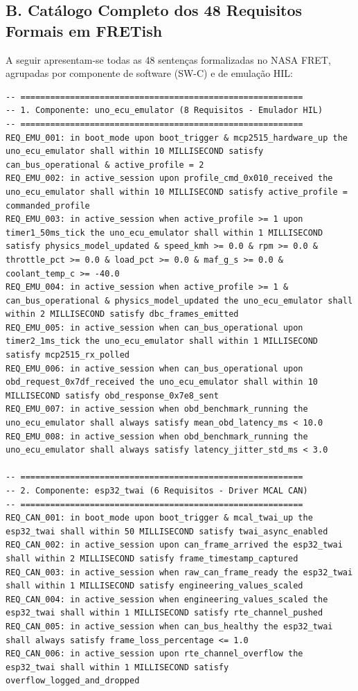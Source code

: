 \subsection*{B. Catálogo Completo dos 48 Requisitos Formais em FRETish}

A seguir apresentam-se todas as 48 sentenças formalizadas no NASA FRET, agrupadas por componente de software (SW-C) e de emulação HIL:

\begin{lstlisting}[language=FRETish, caption={Catálogo das 48 sentenças formalizadas na gramática FRETish.}]
-- =========================================================
-- 1. Componente: uno_ecu_emulator (8 Requisitos - Emulador HIL)
-- =========================================================
REQ_EMU_001: in boot_mode upon boot_trigger & mcp2515_hardware_up the uno_ecu_emulator shall within 10 MILLISECOND satisfy can_bus_operational & active_profile = 2
REQ_EMU_002: in active_session upon profile_cmd_0x010_received the uno_ecu_emulator shall within 10 MILLISECOND satisfy active_profile = commanded_profile
REQ_EMU_003: in active_session when active_profile >= 1 upon timer1_50ms_tick the uno_ecu_emulator shall within 1 MILLISECOND satisfy physics_model_updated & speed_kmh >= 0.0 & rpm >= 0.0 & throttle_pct >= 0.0 & load_pct >= 0.0 & maf_g_s >= 0.0 & coolant_temp_c >= -40.0
REQ_EMU_004: in active_session when active_profile >= 1 & can_bus_operational & physics_model_updated the uno_ecu_emulator shall within 2 MILLISECOND satisfy dbc_frames_emitted
REQ_EMU_005: in active_session when can_bus_operational upon timer2_1ms_tick the uno_ecu_emulator shall within 1 MILLISECOND satisfy mcp2515_rx_polled
REQ_EMU_006: in active_session when can_bus_operational upon obd_request_0x7df_received the uno_ecu_emulator shall within 10 MILLISECOND satisfy obd_response_0x7e8_sent
REQ_EMU_007: in active_session when obd_benchmark_running the uno_ecu_emulator shall always satisfy mean_obd_latency_ms < 10.0
REQ_EMU_008: in active_session when obd_benchmark_running the uno_ecu_emulator shall always satisfy latency_jitter_std_ms < 3.0

-- =========================================================
-- 2. Componente: esp32_twai (6 Requisitos - Driver MCAL CAN)
-- =========================================================
REQ_CAN_001: in boot_mode upon boot_trigger & mcal_twai_up the esp32_twai shall within 50 MILLISECOND satisfy twai_async_enabled
REQ_CAN_002: in active_session upon can_frame_arrived the esp32_twai shall within 2 MILLISECOND satisfy frame_timestamp_captured
REQ_CAN_003: in active_session when raw_can_frame_ready the esp32_twai shall within 1 MILLISECOND satisfy engineering_values_scaled
REQ_CAN_004: in active_session when engineering_values_scaled the esp32_twai shall within 1 MILLISECOND satisfy rte_channel_pushed
REQ_CAN_005: in active_session when can_bus_healthy the esp32_twai shall always satisfy frame_loss_percentage <= 1.0
REQ_CAN_006: in active_session upon rte_channel_overflow the esp32_twai shall within 1 MILLISECOND satisfy overflow_logged_and_dropped


\end{lstlisting}
